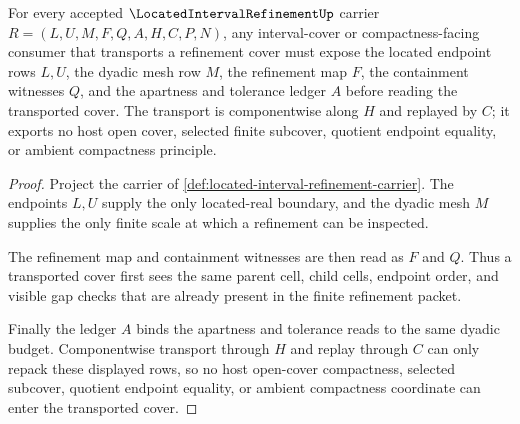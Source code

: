 \begin{theorem}
\label{thm:located-interval-refinement-cover-transport}
For every accepted $\LocatedIntervalRefinementUp$ carrier $R=(L,U,M,F,Q,A,H,C,P,N)$, any interval-cover or compactness-facing consumer that transports a refinement cover must expose the located endpoint rows $L,U$, the dyadic mesh row $M$, the refinement map $F$, the containment witnesses $Q$, and the apartness and tolerance ledger $A$ before reading the transported cover. The transport is componentwise along $H$ and replayed by $C$; it exports no host open cover, selected finite subcover, quotient endpoint equality, or ambient compactness principle.
\end{theorem}
\begin{proof}
Project the carrier of \autoref{def:located-interval-refinement-carrier}. The endpoints $L,U$ supply the only located-real boundary, and the dyadic mesh $M$ supplies the only finite scale at which a refinement can be inspected.

The refinement map and containment witnesses are then read as $F$ and $Q$. Thus a transported cover first sees the same parent cell, child cells, endpoint order, and visible gap checks that are already present in the finite refinement packet.

Finally the ledger $A$ binds the apartness and tolerance reads to the same dyadic budget. Componentwise transport through $H$ and replay through $C$ can only repack these displayed rows, so no host open-cover compactness, selected subcover, quotient endpoint equality, or ambient compactness coordinate can enter the transported cover.
\end{proof}

